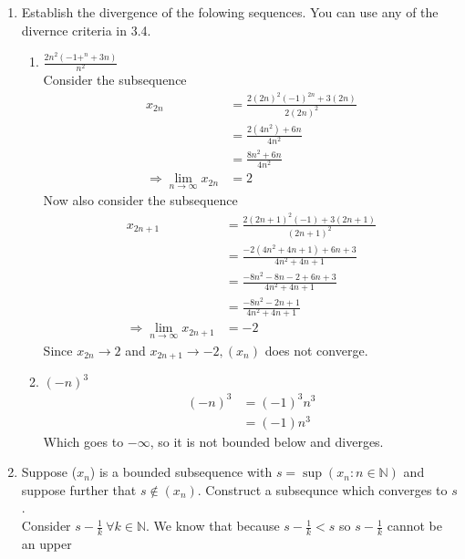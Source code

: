\documentclass[12pt]{article}
\begin{document}
\begin{enumerate}
\begin{proof}
\begin{align*}
				  2x_n^2 + 3x_n &\leq 4 + 3x_n \\
				  x_n(2x_n + 3) &\leq 4+3x_n \\
				  x_n &\leq \frac{4+3x_n}{3+2x_n} \\
				  x_n &\leq x_{n+1}
			  \end{align*}
			  Thus ($x_n$) is decreasing. \\
			  By the Monotone Convergence Theorem ($x_n$) converges.
	      \end{proof}
	\item Establish the divergence of the folowing sequences. You can use any of the divernce 
	criteria in 3.4.
	\begin{enumerate}
		\item $\frac{2n^2(-1+^n+3n)}{n^2}$ \\
		Consider the subsequence 
		\begin{align*}
			x_{2n} &= \frac{2{(2n)}^2{(-1)}^{2n}+3{(2n)}}{2{(2n)}^2} \\
			&= \frac{2(4n^2)+6n}{4n^2} \\
			&= \frac{8n^2+ 6n}{4n^2} \\
			\Rightarrow \lim_{n \to \infty} x_{2n} &= 2
		\end{align*}
		Now also consider the subsequence
		\begin{align*}
			x_{2n+1} &= \frac{2{(2n+1)}^2(-1)+3{(2n+1)}}{{(2n+1)}^2} \\
			&= \frac{-2{(4n^2+4n+1)}+6n+3}{4n^2+4n+1} \\
			&= \frac{-8n^2-8n-2+6n+3}{4n^2+4n+1} \\
			&= \frac{-8n^2-2n+1}{4n^2+4n+1} \\
			\Rightarrow \lim_{n \to \infty}x_{2n+1} &= -2
		\end{align*}
		Since $x_{2n} \rightarrow 2$ and $x_{2n+1} \rightarrow -2, (x_n)$ does not converge.
		\item ${(-n)}^3$ 
		\begin{align*}
			{(-n)}^3 &= {(-1)}^3n^3 \\
			&= (-1)n^3
		\end{align*}
		Which goes to $-\infty$, so it is not bounded below and diverges.
	\end{enumerate}
	\item Suppose ($x_n$) is a bounded subsequence with $s = \sup(x_n:n \in \mathbb{N})$ and suppose further 
	that $s \notin {(x_n)}$. Construct a subsequnce which converges to $s$. \\
	Consider $s-\frac{1}{k} \ \forall k \in \mathbb{N}$. We know that because $s-\frac{1}{k} < s$ so $s-\frac{1}{k}$ cannot be an upper 

\end{enumerate}
\end{document}
